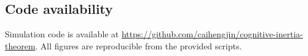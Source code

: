 \subsection{Code availability}
Simulation code is available at \url{https://github.com/caihengjin/cognitive-inertia-theorem}. All figures are reproducible from the provided scripts.


